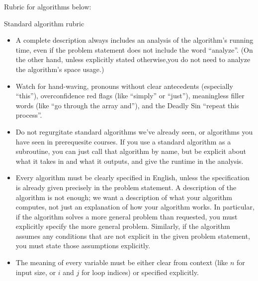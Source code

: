 \documentclass[11pt]{article}
\begin{document}

Rubric for algorithms below:

\begin{Rubric}{Standard algorithm rubric}~
	\begin{itemize}
\item A complete description always includes an analysis of the algorithm's
running time, even if the problem statement does not include the word “analyze”.
(On the other hand, unless explicitly stated otherwise,you do not need to analyze
the algorithm's space usage.) 
\item Watch for hand-waving, pronouns without clear antecedents (especially
“this”), overconfidence red flags (like “simply” or “just”), meaningless filler
words (like “go through the array and”), and the
Deadly Sin “repeat this process”.
\item Do not regurgitate standard algorithms we've already seen, or algorithms
you have seen in prerequesite courses. If you use a standard algorithm as a
subroutine, you can just call that algorithm by name, but be explicit about
what it takes in and what it outputs, and give the runtime in the analysis.
\item Every algorithm must be clearly specified in English, unless the
specification is already given precisely in the problem statement. A description
of the algorithm is not enough; we want a description of what your algorithm
computes, not just an explanation of how your algorithm works.  In particular,
if the algorithm solves a more general problem than requested, you must
explicitly specify the more general problem. Similarly, if the algorithm assumes
any conditions that are not explicit in the given problem statement, you must
state those assumptions explicitly.
\item The meaning of every variable must be either clear from context (like $n$
for input size, or $i$ and $j$ for loop indices) or specified explicitly.
	\end{itemize}
\end{Rubric}
\end{document}

